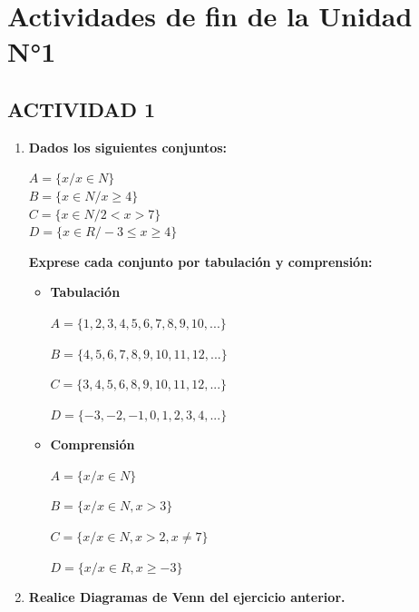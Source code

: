 \documentclass[12pt]{article}
\begin{document}
    
  
    \section*{\centering Actividades de fin de la Unidad N°1}

        \subsection*{\textbf{\centering ACTIVIDAD 1}}

            \begin{enumerate}
                \item \textbf{Dados los siguientes conjuntos:}\par$A = \{x / x \in N\}$\\$B = \{ x \in N / x \geq 4 \}$\\$C = \{ x \in N / 2 < x > 7 \}$\\$D = \{ x \in R / -3 \leq x \geq 4 \}$\par\textbf{Exprese cada conjunto por tabulación y comprensión:} 
                    \begin{itemize}
                        \item \textbf{Tabulación}
                            \par$A = \{1, 2, 3, 4, 5, 6, 7, 8, 9, 10, ...\}$
                            \par$B = \{4, 5 ,6, 7, 8, 9, 10, 11, 12, ...\}$
                            \par$C = \{3, 4, 5, 6, 8, 9, 10, 11, 12, ...\}$
                            \par$D = \{-3, -2, -1, 0, 1, 2, 3, 4, ...\}$
                        \item \textbf{Comprensión}
                            \par$A = \{x / x \in N\}$
                            \par$B = \{x / x \in N, x > 3\}$
                            \par$C = \{x / x \in N, x > 2, x \neq 7\}$
                            \par$D = \{x / x \in R, x \geq -3\}$
                    \end{itemize}
                \item \textbf{Realice Diagramas de Venn del ejercicio anterior.}
                
            \end{enumerate}
\end{document}
